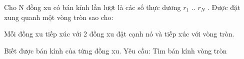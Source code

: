 Cho N đồng xu có bán kính lần lượt là các số thực dương $r_{1}$   .. $r_{N}$   . Được đặt xung quanh một vòng tròn sao cho:  

   Mỗi đồng xu tiếp xúc với 2 đồng xu đặt cạnh nó và tiếp xúc với vòng tròn.  

   Biết được bán kính của từng đồng xu. Yêu cầu: Tìm bán kính vòng tròn